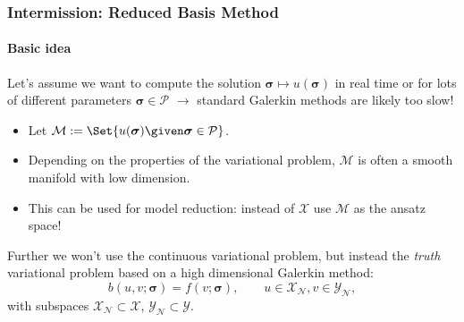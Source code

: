 \begin{frame}[t]
    \frametitle{Intermission: Reduced Basis Method}
    \framesubtitle{Basic idea}

    \onslide
    Let's assume we want to compute the solution $\bm \sigma \mapsto u(\bm \sigma)$ in real time or for lots of different parameters $\bm \sigma \in \mathcal P$
    $\rightarrow$ standard Galerkin methods are likely too slow!

    \begin{itemize}
        \item {}Let $\mathcal M := \Set{ u(\bm \sigma) \given \bm \sigma \in \mathcal P }$.
        \item Depending on the properties of the variational problem, $\mathcal M$ is often a smooth manifold with low dimension.
        \item {} This can be used for model reduction: instead of $\mathcal X$ use $\mathcal M$ as the ansatz space!
    \end{itemize}

    \vfill

    Further we won't use the continuous variational problem, but instead the \emph{truth} variational problem based on a high dimensional Galerkin method:
    \begin{equation}
        b(u, v; \bm \sigma) = f(v; \bm \sigma), \qquad u \in \mathcal X_{\mathcal N}, v \in \mathcal Y_{\mathcal N},
    \end{equation}
    with subspaces $\mathcal X_{\mathcal N} \subset \mathcal X$, $\mathcal Y_{\mathcal N} \subset \mathcal Y$.
\end{frame}

